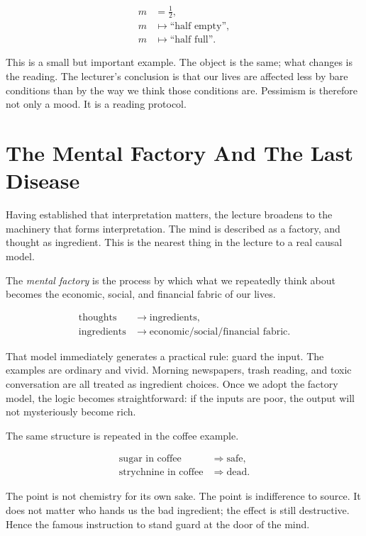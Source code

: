 \begin{align}
m &= \tfrac12,\\
m &\mapsto \text{``half empty''},\\
m &\mapsto \text{``half full''}.
\end{align}

This is a small but important example. The object is the same; what changes is the reading. The lecturer's conclusion is that our lives are affected less by bare conditions than by the way we think those conditions are. Pessimism is therefore not only a mood. It is a reading protocol.

\section{The Mental Factory And The Last Disease}

Having established that interpretation matters, the lecture broadens to the machinery that forms interpretation. The mind is described as a factory, and thought as ingredient. This is the nearest thing in the lecture to a real causal model.

\begin{definition}
The \emph{mental factory} is the process by which what we repeatedly think about becomes the economic, social, and financial fabric of our lives.
\end{definition}

\begin{align}
\text{thoughts} &\rightarrow \text{ingredients},\\
\text{ingredients} &\rightarrow \text{economic/social/financial fabric}.
\end{align}

That model immediately generates a practical rule: guard the input. The examples are ordinary and vivid. Morning newspapers, trash reading, and toxic conversation are all treated as ingredient choices. Once we adopt the factory model, the logic becomes straightforward: if the inputs are poor, the output will not mysteriously become rich.

The same structure is repeated in the coffee example.

\begin{align}
\text{sugar in coffee} &\Rightarrow \text{safe},\\
\text{strychnine in coffee} &\Rightarrow \text{dead}.
\end{align}

The point is not chemistry for its own sake. The point is indifference to source. It does not matter who hands us the bad ingredient; the effect is still destructive. Hence the famous instruction to stand guard at the door of the mind.

